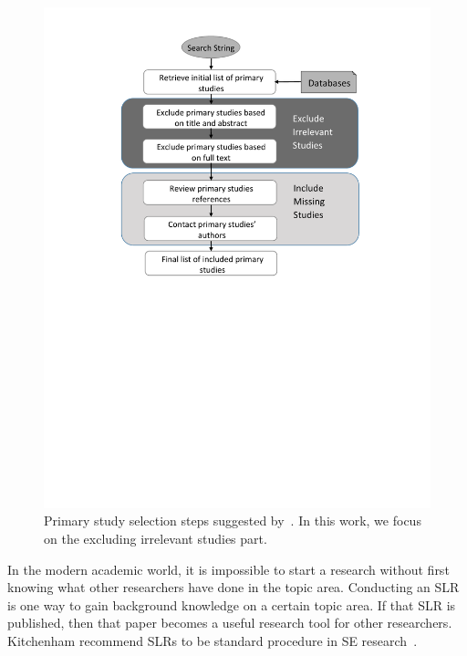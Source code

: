 \documentclass{svjour3}
\theoremstyle{break}
\begin{document}
\begin{figure}[t]
\begin{minipage}[t]{.48\linewidth}
    \includegraphics[width=\linewidth]{primary_study_selection.pdf}
    \caption{Primary study selection steps suggested by~\cite{keele2007guidelines}. In this work, we focus on the excluding irrelevant studies part.}
    \label{fig: prime}
    \end{minipage}
\end{figure}



In the modern academic world, it is
impossible to start a research without first knowing what other researchers have
done in the topic area. Conducting an SLR is one way to gain
background knowledge on a certain topic area.
If that SLR is published, then that paper becomes a useful research tool
for other researchers.  Kitchenham recommend SLRs to be standard
procedure in SE research~\cite{kitchenham2004evidence,keele2007guidelines}.
\end{document}
